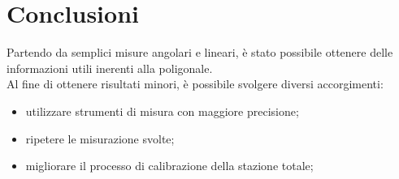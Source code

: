 \section{Conclusioni}
Partendo da semplici misure angolari e lineari, è stato possibile ottenere delle informazioni utili inerenti alla poligonale.\\
Al fine di ottenere risultati minori, è possibile svolgere diversi accorgimenti:
\begin{itemize}
    \item utilizzare strumenti di misura con maggiore precisione;
    \item ripetere le misurazione svolte;
    \item migliorare il processo di calibrazione della stazione totale;
\end{itemize}